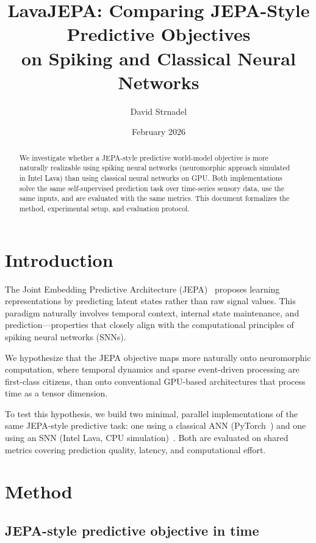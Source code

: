 \documentclass[11pt,a4paper]{article}
\title{%
  LavaJEPA: Comparing JEPA-Style Predictive Objectives\\
  on Spiking and Classical Neural Networks%
}
\author{David Strnadel}
\date{February 2026}
\begin{document}
\maketitle

\begin{abstract}
We investigate whether a JEPA-style predictive world-model objective is more
naturally realizable using spiking neural networks (neuromorphic approach
simulated in Intel Lava) than using classical neural networks on GPU.  Both
implementations solve the same self-supervised prediction task over time-series
sensory data, use the same inputs, and are evaluated with the same metrics.
This document formalizes the method, experimental setup, and evaluation
protocol.
\end{abstract}

\section{Introduction}

The Joint Embedding Predictive Architecture
(JEPA)~\cite{lecun2022path,assran2023ijepa} proposes learning
representations by predicting latent states rather than raw signal values.
This paradigm naturally involves temporal context, internal state maintenance,
and prediction---properties that closely align with the computational
principles of spiking neural networks (SNNs).

We hypothesize that the JEPA objective maps more naturally onto neuromorphic
computation, where temporal dynamics and sparse event-driven processing are
first-class citizens, than onto conventional GPU-based architectures that
process time as a tensor dimension.

To test this hypothesis, we build two minimal, parallel implementations of the
same JEPA-style predictive task: one using a classical ANN (PyTorch~\cite{paszke2019pytorch}) and one
using an SNN (Intel Lava, CPU simulation)~\cite{lava2023}.  Both are evaluated on shared
metrics covering prediction quality, latency, and computational effort.

\section{Method}\label{sec:method}

\subsection{JEPA-style predictive objective in time}
\end{document}

